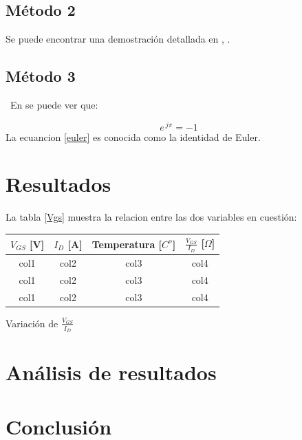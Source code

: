 \documentclass[]{article}
\makeatletter
\newenvironment{tablehere}    %
  {\def\@captype{table}}    %
  {}              %
\makeatother
\begin{document}
\begin{multicols}{2}
\subsection{Método 2} %
\lipsum[7]
Se puede encontrar una demostración detallada en \cite{Sh:575} , \cite{Sh:572}.
\subsection{Método 3} %
\
\lipsum[8] En \cite{webster} se puede ver que:

\begin{equation}
 e^{ \ j  \pi} = -1
 \label{euler}
\end{equation}
La ecuancion \ref{euler} es conocida como la identidad de Euler.

\section{Resultados}

La tabla \ref{Vgs} muestra la relacion entre las dos variables en cuestión:

\begin{tablehere}
\begin{center}
\begin{tabular}{|c|c|c|c|}
\hline
$V_{GS}$ [V] & $I_{D}$ [A] & Temperatura [$C^{o}$] & $\frac{V_{GS}}{I_D}$ [$\Omega$] \\ 
\hline
col1 & col2 & col3 & col4 \\

col1 & col2 & col3 & col4 \\

col1 & col2 & col3 & col4 \\
\hline
\end{tabular}
\caption{Variación de $\frac{V_{GS}}{I_D}$}
\label{Vgs}
\end{center}
\end{tablehere}
\lipsum[1]


\section{Análisis de resultados}
\lipsum[1]
\section{Conclusión}
\lipsum[1]

\printbibliography 
\end{multicols}
 
\end{document}
